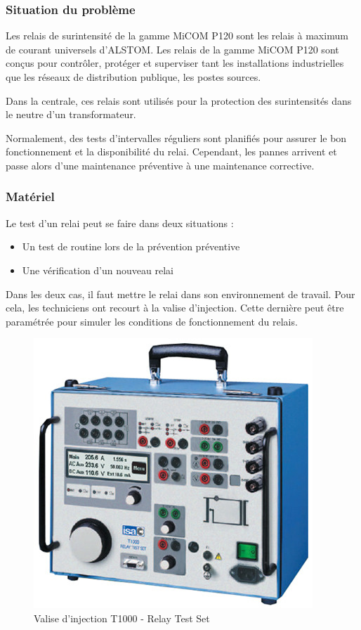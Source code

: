 \subsubsection{Situation du problème}
Les relais de surintensité de la gamme  MiCOM P120  sont les relais à maximum de courant universels d'ALSTOM. Les relais de la gamme MiCOM P120 sont conçus pour contrôler, protéger et superviser tant les installations industrielles que les réseaux de distribution publique, les postes sources.

Dans la centrale, ces relais sont utilisés pour la  protection des surintensités dans le neutre d'un transformateur.

Normalement, des tests d'intervalles réguliers sont planifiés pour assurer le bon fonctionnement et la disponibilité du relai. Cependant, les pannes arrivent et passe alors  d'une maintenance préventive à une maintenance corrective.
\pagebreak
\subsubsection{Matériel}
Le test d'un relai peut se faire dans deux situations :

\begin{itemize}
\item Un test de routine lors de la prévention préventive
\item Une vérification d'un nouveau relai
\end{itemize}
Dans les deux cas, il faut mettre le relai dans son   environnement de travail.
Pour cela, les techniciens ont recourt à la valise d'injection.
Cette dernière  peut être paramétrée pour simuler les conditions de fonctionnement du relais. 

\begin{figure}[hbtp]
\centering
\includegraphics[scale=0.4]{./Figures/T1000.jpg}
\caption{Valise d'injection T1000 - Relay Test Set}
\end{figure}


